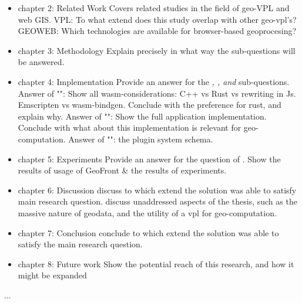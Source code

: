 \begin{itemize}[\m{->}]

  \item chapter 2: Related Work
  \subitem Covers related studies in the field of geo-VPL and web GIS. 
  \subitem VPL: To what extend does this study overlap with other geo-vpl's? 
  \subitem GEOWEB: Which technologies are available for browser-based geoprocesing?  

  \item chapter 3: Methodology
  \subitem Explain precisely in what way the sub-questions will be answered.

  \item chapter 4: Implementation
  \subitem Provide an answer for the \textit{\mySubRQOneTitle, \mySubRQTwoTitle , and \mySubRQThreeTitle} sub-questions. 
  \subitem Answer of "\mySubRQOneTitle": Show all wasm-considerations: C++ vs Rust vs rewriting in Js. Emscripten vs wasm-bindgen. Conclude with the preference for rust, and explain why.
  \subitem Answer of "\mySubRQTwoTitle": Show the full application implementation. Conclude with what about this implementation is relevant for geo-computation. 
  \subitem Answer of "\mySubRQThreeTitle": the plugin system schema. 
  
  \item chapter 5: Experiments 
  \subitem Provide an answer for the question of \mySubRQFourTitle.
  \subitem Show the results of usage of GeoFront \& the results of experiments.

  \item chapter 6: Discussion
  \subitem discuss to which extend the solution was able to satisfy main research question.
  \subitem discuss unaddressed aspects of the thesis, such as the massive nature of geodata, and the utility of a vpl for geo-computation.

  \item chapter 7: Conclusion
  \subitem conclude to which extend the solution was able to satisfy the main research question. 
  
  \item chapter 8: Future work
  \subitem Show the potential reach of this research, and how it might be expanded

\end{itemize}

...